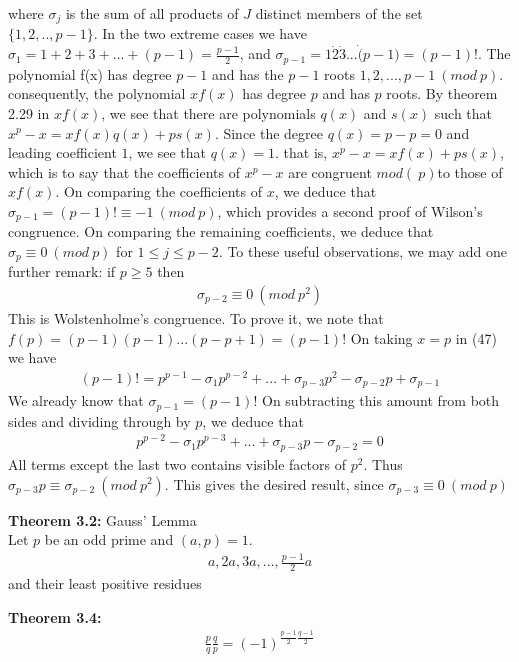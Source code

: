 \documentclass[a4paper]{article}
\begin{document}
where $\sigma_j$ is the sum of all products of $J$ distinct members of the set $\{1,2,..,p-1\}$. In the two extreme cases we have $\sigma_1=1+2+3+...+(p-1)=\frac{p-1}{2}$, and $\sigma_{p-1}=1\dot2\dot3\dot...\dot(p-1)=(p-1)!$. The polynomial f(x) has degree $p-1$ and has the $p-1$ roots $1,2,...,p-1\ (mod\ p)$. consequently, the polynomial $xf(x)$ has degree $p$ and has $p$ roots. By theorem 2.29 in $xf(x)$, we see that there are polynomials $q(x)$ and $s(x)$ such that $x^p-x=xf(x)q(x)+ps(x)$. Since the degree $q(x)=p-p=0$ and leading coefficient $1$, we see that $q(x)=1$. that is, $x^p-x=xf(x)+ps(x)$, which is to say that the coefficients of $x^p-x$ are congruent $mod(\ p)$to those of $xf(x)$. On comparing the coefficients of $x$, we deduce that $\sigma_{p-1}=(p-1)!\equiv -1\ (mod\ p)$, which provides a second proof of Wilson's congruence. On comparing the remaining coefficients, we deduce that $\sigma_{p}\equiv 0\ (mod\ p)$ for $1\leq j\leq p-2$. To these useful observations, we may add one further remark: if $p\geq 5$ then
\begin{align*}
    \sigma_{p-2}\equiv 0\ (mod\ p^2)
\end{align*}
This is Wolstenholme's congruence. To prove it, we note that $f(p)=(p-1)(p-1)...(p-p+1)=(p-1)!$ On taking $x=p$ in (47) we have
\begin{align*}
    (p-1)! = p^{p-1}-\sigma_1p^{p-2}+...+\sigma_{p-3}p^2-\sigma_{p-2}p+\sigma_{p-1}
\end{align*}
We already know that $\sigma_{p-1}=(p-1)!$ On subtracting this amount from both sides and dividing through by $p$, we deduce that
\begin{align*}
    p^{p-2}-\sigma_{1}p^{p-3}+...+\sigma_{p-3}p-\sigma_{p-2}=0
\end{align*}
All terms except the last two contains visible factors of $p^2$. Thus $\sigma_{p-3}p\equiv \sigma_{p-2}\ (mod\ p^2)$. This gives the desired result, since $\sigma_{p-3}\equiv 0\ (mod\ p)$

\textbf{Theorem 3.2:} Gauss' Lemma\\
Let $p$ be an odd prime and $(a,p)=1$.
\begin{align}
    a,2a,3a,...,\frac{p-1}{2}a
\end{align}
and their least positive residues


\textbf{Theorem 3.4:}\\

\begin{align}
    \frac{p}{q}\frac{q}{p}=(-1)^{\frac{p-1}{2}\frac{q-1}{2}}
\end{align}
\end{document}
